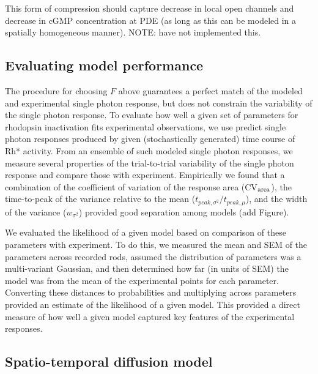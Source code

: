 \documentclass[12pt]{article}
\def\GCAPKO{GCAP$^{-/-}$}
\def\GCAPHET{GCAP$^{+/-}$}
\def\ArrHET{Arr$^{+/-}$}
\def\RKHET{GRK1$^{+/-}$}
\begin{document}
This form of compression should capture decrease in local open channels and decrease in cGMP concentration at PDE (as long as this can be modeled in a spatially homogeneous manner).  NOTE: have not implemented this.

\subsection{Evaluating model performance}

The procedure for choosing $F$ above guarantees a perfect match of the modeled and experimental single photon response, but does not constrain the variability of the single photon response.  To evaluate how well a given set of parameters for rhodopsin inactivation fits experimental observations, we use predict single photon responses produced by given (stochastically generated) time course of Rh* activity.  From an ensemble of such modeled single photon responses, we measure several properties of the trial-to-trial variability of the single photon response and compare those with experiment.  Empirically we found that a combination of the coefficient of variation of the response area (CV$_{\rm area}$), the time-to-peak of the variance relative to the mean ($t_{peak,\sigma^2} / t_{peak, \mu}$), and the width of the variance ($w_{\sigma^2}$) provided good separation among models (add Figure). 

We evaluated the likelihood of a given model based on comparison of these parameters with experiment.  To do this, we measured the mean and SEM of the parameters across recorded rods, assumed the distribution of parameters was a multi-variant Gaussian, and then determined how far (in units of SEM) the model was from the mean of the experimental points for each parameter.  Converting these distances to probabilities and multiplying across parameters provided an estimate of the likelihood of a given model.  This provided a direct measure of how well a given model captured key features of the experimental responses.  


\subsection{Spatio-temporal diffusion model}
\end{document}

